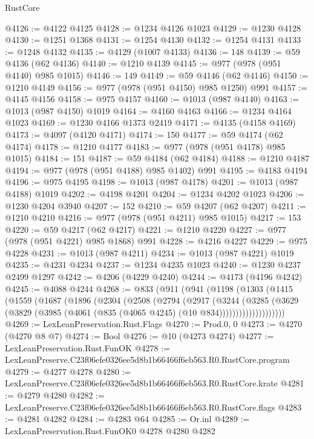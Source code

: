 \begin{lexlean}{RustCore}
\begin{coremodule}
@4126 := @4122 @4125
@4128 := @1234 @4126 @1023
@4129 := @1230 @4128
@4130 := @1251 @1368
@4131 := @1254 @4130
@4132 := @1254 @4131
@4133 := @1248 @4132
@4135 := @4129 (@1007 @4133)
@4136 := 148
@4139 := @59 @4136 (@62 @4136)
@4140 := @1210 @4139
@4145 := @977 (@978 (@951 @4140) @985 @1015)
@4146 := 149
@4149 := @59 @4146 (@62 @4146)
@4150 := @1210 @4149
@4156 := @977 (@978 (@951 @4150) @985 @1250) @991
@4157 := @4145 @4156
@4158 := @975 @4157
@4160 := @1013 (@987 @4140)
@4163 := @1013 (@987 @4150) @1019
@4164 := @4160 @4163
@4166 := @1234 @4164 @1023
@4169 := @1230 @4166 @1373 @2419
@4171 := @4135 (@4158 @4169)
@4173 := @4097 (@4120 @4171)
@4174 := 150
@4177 := @59 @4174 (@62 @4174)
@4178 := @1210 @4177
@4183 := @977 (@978 (@951 @4178) @985 @1015)
@4184 := 151
@4187 := @59 @4184 (@62 @4184)
@4188 := @1210 @4187
@4194 := @977 (@978 (@951 @4188) @985 @1402) @991
@4195 := @4183 @4194
@4196 := @975 @4195
@4198 := @1013 (@987 @4178)
@4201 := @1013 (@987 @4188) @1019
@4202 := @4198 @4201
@4204 := @1234 @4202 @1023
@4206 := @1230 @4204 @3940
@4207 := 152
@4210 := @59 @4207 (@62 @4207)
@4211 := @1210 @4210
@4216 := @977 (@978 (@951 @4211) @985 @1015)
@4217 := 153
@4220 := @59 @4217 (@62 @4217)
@4221 := @1210 @4220
@4227 := @977 (@978 (@951 @4221) @985 @1868) @991
@4228 := @4216 @4227
@4229 := @975 @4228
@4231 := @1013 (@987 @4211)
@4234 := @1013 (@987 @4221) @1019
@4235 := @4231 @4234
@4237 := @1234 @4235 @1023
@4240 := @1230 @4237 @2499 @1297
@4242 := @4206 (@4229 @4240)
@4244 := @4173 (@4196 @4242)
@4245 := @4088 @4244
@4268 := @833
    (@911
      (@941
        (@1198
          (@1303
            (@1415
              (@1559
                (@1687
                  (@1896
                    (@2304
                      (@2508
                        (@2794
                          (@2917
                            (@3244
                              (@3285
                                (@3629
                                  (@3829
                                    (@3985 (@4061 (@835 (@4065 @4245) (@10 @834))))))))))))))))))))
@4269 := LexLeanPreservation.Rust.Flags
@4270 := Prod.{0, 0}
@4273 := @4270 (@4270 @8 @7)
@4274 := Bool
@4276 := @10 (@4273 @4274)
@4277 := LexLeanPreservation.Rust.FunOK
@4278 := LexLeanPreserve.C23f06efe0326ee5d8b1b66466f6eb563.R0.RustCore.program
@4279 := @4277 @4278
@4280 := LexLeanPreserve.C23f06efe0326ee5d8b1b66466f6eb563.R0.RustCore.krate
@4281 := @4279 @4280
@4282 := LexLeanPreserve.C23f06efe0326ee5d8b1b66466f6eb563.R0.RustCore.flags
@4283 := @4281 @4282
@4284 := @4283 @64
@4285 := Or.inl
@4289 := LexLeanPreservation.Rust.FunOK0 @4278 @4280 @4282

\end{coremodule}
\end{lexlean}
